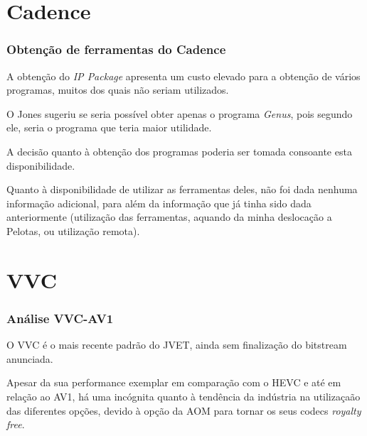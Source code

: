 \documentclass{beamer}
\begin{document}
\section{Cadence}
\begin{frame}
       \frametitle{Obtenção de ferramentas do Cadence}

       A obtenção do \textit{IP Package} apresenta um custo elevado para a obtenção de vários programas, muitos dos quais não seriam utilizados.

       O Jones sugeriu se seria possível obter apenas o programa \textit{Genus}, pois segundo ele, seria o programa que teria maior utilidade.

       A decisão quanto à obtenção dos programas poderia ser tomada consoante esta disponibilidade.

       Quanto à disponibilidade de utilizar as ferramentas deles, não foi dada nenhuma informação adicional, para além da informação que já tinha sido dada anteriormente (utilização das ferramentas, aquando da minha deslocação a Pelotas, ou utilização remota).
\end{frame}

\section{VVC}
\begin{frame}
       \frametitle{Análise VVC-AV1}

       O VVC é o mais recente padrão do JVET, ainda sem finalização do bitstream anunciada.

       Apesar da sua performance exemplar em comparação com o HEVC e até em relação ao AV1, há uma incógnita quanto à tendência da indústria na utilizaçaão das diferentes opções, devido à opção da AOM para tornar os seus codecs \textit{royalty free}.
\end{frame}
\end{document}
